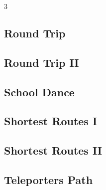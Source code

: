 \documentclass[8pt]{extarticle}
\begin{document}
\begin{multicols*}{3}
\subsection{Round Trip}
\begin{caixaenunciado}

\end{caixaenunciado}
\vspace{0.3cm}


\subsection{Round Trip II}
\begin{caixaenunciado}

\end{caixaenunciado}
\vspace{0.3cm}


\subsection{School Dance}
\begin{caixaenunciado}

\end{caixaenunciado}
\vspace{0.3cm}


\subsection{Shortest Routes I}
\begin{caixaenunciado}

\end{caixaenunciado}
\vspace{0.3cm}


\subsection{Shortest Routes II}
\begin{caixaenunciado}

\end{caixaenunciado}
\vspace{0.3cm}


\subsection{Teleporters Path}
\begin{caixaenunciado}

\end{caixaenunciado}
\vspace{0.3cm}

\end{multicols*}
\end{document}
